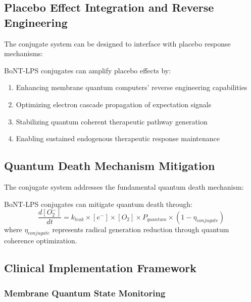 \documentclass[11pt,a4paper]{article}
\begin{document}
\subsection{Placebo Effect Integration and Reverse Engineering}

The conjugate system can be designed to interface with placebo response mechanisms:

\begin{theorem}
BoNT-LPS conjugates can amplify placebo effects by:
\begin{enumerate}
\item Enhancing membrane quantum computers' reverse engineering capabilities
\item Optimizing electron cascade propagation of expectation signals
\item Stabilizing quantum coherent therapeutic pathway generation
\item Enabling sustained endogenous therapeutic response maintenance
\end{enumerate}
\end{theorem}

\subsection{Quantum Death Mechanism Mitigation}

The conjugate system addresses the fundamental quantum death mechanism:

\begin{definition}
BoNT-LPS conjugates can mitigate quantum death through:
\begin{equation}
\frac{d[O_2^-]}{dt} = k_{leak} \times [e^-] \times [O_2] \times P_{quantum} \times (1 - \eta_{conjugate})
\end{equation}
where $\eta_{conjugate}$ represents radical generation reduction through quantum coherence optimization.
\end{definition}

\subsection{Clinical Implementation Framework}

\subsubsection{Membrane Quantum State Monitoring}
\end{document}
